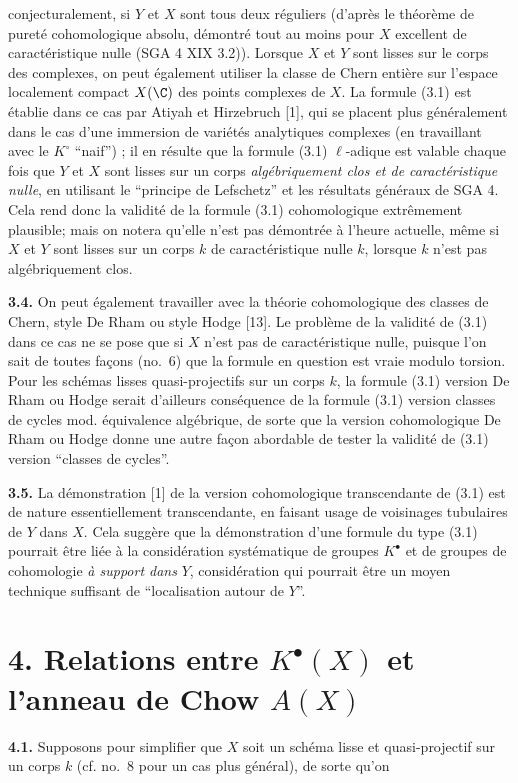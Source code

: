 conjecturalement, si $Y$ et $X$ sont tous deux réguliers (d'après le théorème de pureté cohomologique absolu, démontré tout au moins pour $X$ excellent de caractéristique nulle (SGA 4 XIX 3.2)). Lorsque $X$ et $Y$ sont lisses sur le corps des complexes, on peut également utiliser la classe de Chern entière sur l'espace localement compact $X(\C)$ des points complexes de $X$. La formule (3.1) est établie dans ce cas par Atiyah et Hirzebruch [1], qui se placent plus généralement dans le cas d'une immersion de variétés analytiques complexes (en travaillant avec le $K^\circ$ ``naif'') ; il en résulte que la formule (3.1) $\ell$-adique est valable chaque fois que $Y$ et $X$ sont lisses sur un corps \emph{algébriquement clos et de caractéristique nulle}, en utilisant le ``principe de Lefschetz'' et les résultats généraux de SGA 4. Cela rend donc la validité de la formule (3.1) cohomologique extrêmement plausible; mais on notera qu'elle n'est pas démontrée à l'heure actuelle, même si $X$ et $Y$ sont lisses sur un corps $k$ de caractéristique nulle $k$, lorsque $k$ n'est pas algébriquement clos.

\textbf{3.4.} On peut également travailler avec la théorie cohomologique des classes de Chern, style De Rham ou style Hodge [13]. Le problème de la validité de (3.1) dans ce cas ne se pose que si $X$ n'est pas de caractéristique nulle, puisque l'on sait de toutes façons (no.~6) que la formule en question est vraie modulo torsion. Pour les schémas lisses quasi-projectifs sur un corps $k$, la formule (3.1) version De Rham ou Hodge serait d'ailleurs conséquence de la formule (3.1) version classes de cycles mod. équivalence algébrique, de sorte que la version cohomologique De Rham ou Hodge donne une autre façon abordable de tester la validité de (3.1) version ``classes de cycles''.

\textbf{3.5.} La démonstration [1] de la version cohomologique transcendante de (3.1) est de nature essentiellement transcendante, en faisant usage de voisinages tubulaires de $Y$ dans $X$. Cela suggère que la démonstration d'une formule du type (3.1) pourrait être liée à la considération systématique de groupes $K^\bullet$ et de groupes de cohomologie \emph{à support dans} $Y$, considération qui pourrait être un moyen technique suffisant de ``localisation autour de $Y$''.

\section*{4. Relations entre $K^\bullet(X)$ et l'anneau de Chow $A(X)$}

\textbf{4.1.} Supposons pour simplifier que $X$ soit un schéma lisse et quasi-projectif sur un corps $k$ (cf. no.~8 pour un cas plus général), de sorte qu'on
